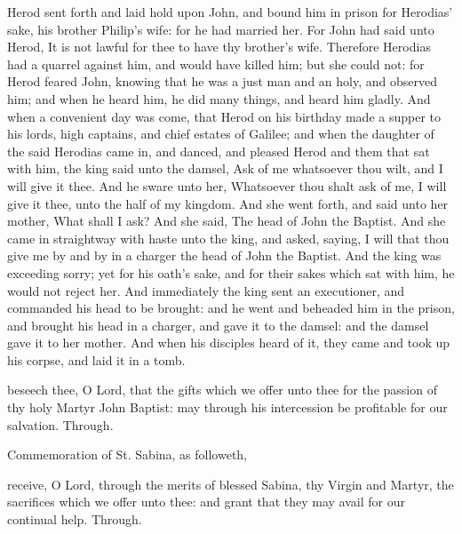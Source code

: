  Herod sent forth and laid hold upon John, and bound him in prison for Herodias' sake, his brother Philip’s wife: for he had married her. For John had said unto Herod, It is not lawful for thee to have thy brother’s wife. Therefore Herodias had a quarrel against him, and would have killed him; but she could not: for Herod feared John, knowing that he was a just man and an holy, and observed him; and when he heard him, he did many things, and heard him gladly. And when a convenient day was come, that Herod on his birthday made a supper to his lords, high captains, and chief estates of Galilee; and when the daughter of the said Herodias came in, and danced, and pleased Herod and them that sat with him, the king said unto the damsel, Ask of me whatsoever thou wilt, and I will give it thee. And he sware unto her, Whatsoever thou shalt ask of me, I will give it thee, unto the half of my kingdom. And she went forth, and said unto her mother, What shall I ask? And she said, The head of John the Baptist. And she came in straightway with haste unto the king, and asked, saying, I will that thou give me by and by in a charger the head of John the Baptist. And the king was exceeding sorry; yet for his oath’s sake, and for their sakes which sat with him, he would not reject her. And immediately the king sent an executioner, and commanded his head to be brought: and he went and beheaded him in the prison, and brought his head in a charger, and gave it to the damsel: and the damsel gave it to her mother. And when his disciples heard of it, they came and took up his corpse, and laid it in a tomb.


\secret
{} beseech thee, O Lord, that the gifts which we offer unto thee for the passion of thy holy Martyr John Baptist: may through his intercession be profitable for our salvation. Through.

\begin{rubric}
	 Commemoration of St. Sabina, as followeth,
\end{rubric}
 receive, O Lord, through the merits of blessed Sabina, thy Virgin and Martyr, the sacrifices which we offer unto thee: and grant that they may avail for our continual help. Through.


